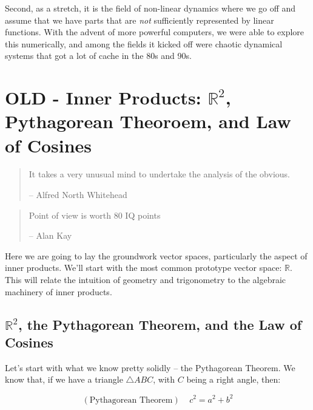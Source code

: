 \documentclass[
]{book}
\begin{document}
Second, as a stretch, it is the field of non-linear dynamics where we go off and assume that we have parts that are \emph{not} sufficiently represented by linear functions. With the advent of more powerful computers, we were able to explore this numerically, and among the fields it kicked off were chaotic dynamical systems that got a lot of cache in the 80s and 90s.

\hypertarget{old---inner-products-mathbbr2-pythagorean-theoroem-and-law-of-cosines}{%
\chapter{\texorpdfstring{OLD - Inner Products: \(\mathbb{R}^2\), Pythagorean Theoroem, and Law of Cosines}{OLD - Inner Products: \textbackslash mathbb\{R\}\^{}2, Pythagorean Theoroem, and Law of Cosines}}\label{old---inner-products-mathbbr2-pythagorean-theoroem-and-law-of-cosines}}

\begin{quote}
It takes a very unusual mind to undertake the analysis of the obvious.

-- Alfred North Whitehead
\end{quote}

\begin{quote}
Point of view is worth 80 IQ points

-- Alan Kay
\end{quote}

Here we are going to lay the groundwork vector spaces, particularly the aspect of inner products. We'll start with the most common prototype vector space: \(\mathbb{R}\). This will relate the intuition of geometry and trigonometry to the algebraic machinery of inner products.

\hypertarget{mathbbr2-the-pythagorean-theorem-and-the-law-of-cosines}{%
\section{\texorpdfstring{\(\mathbb{R}^2\), the Pythagorean Theorem, and the Law of Cosines}{\textbackslash mathbb\{R\}\^{}2, the Pythagorean Theorem, and the Law of Cosines}}\label{mathbbr2-the-pythagorean-theorem-and-the-law-of-cosines}}

Let's start with what we know pretty solidly -- the Pythagorean Theorem. We know that, if we have a triangle \(\triangle ABC\), with \(C\) being a right angle, then:

\[(\text{Pythagorean Theorem}) \ \ \ \ \ c^2 = a^2 + b^2\]
\end{document}

